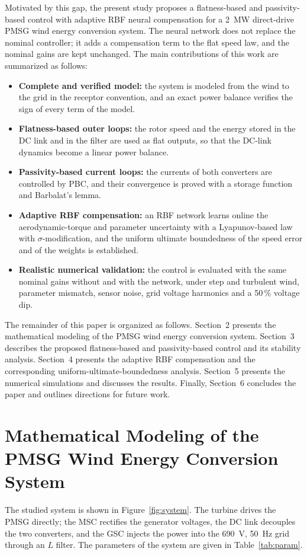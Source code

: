 \documentclass[11pt,a4paper]{article}
\begin{document}
Motivated by this gap, the present study proposes a flatness-based and passivity-based control with
adaptive RBF neural compensation for a 2~MW direct-drive PMSG wind energy conversion system. The neural
network does not replace the nominal controller; it adds a compensation term to the flat speed law, and
the nominal gains are kept unchanged. The main contributions of this work are summarized as follows:
\begin{itemize}[leftmargin=*,itemsep=2pt]
\item \textbf{Complete and verified model:} the system is modeled from the wind to the grid in the
receptor convention, and an exact power balance verifies the sign of every term of the model.
\item \textbf{Flatness-based outer loops:} the rotor speed and the energy stored in the DC link and in the
filter are used as flat outputs, so that the DC-link dynamics become a linear power balance.
\item \textbf{Passivity-based current loops:} the currents of both converters are controlled by PBC, and
their convergence is proved with a storage function and Barbalat's lemma.
\item \textbf{Adaptive RBF compensation:} an RBF network learns online the aerodynamic-torque and parameter
uncertainty with a Lyapunov-based law with $\sigma$-modification, and the uniform ultimate boundedness of
the speed error and of the weights is established.
\item \textbf{Realistic numerical validation:} the control is evaluated with the same nominal gains without
and with the network, under step and turbulent wind, parameter mismatch, sensor noise, grid voltage
harmonics and a 50\,\% voltage dip.
\end{itemize}

The remainder of this paper is organized as follows. Section~2 presents the mathematical modeling of the
PMSG wind energy conversion system. Section~3 describes the proposed flatness-based and passivity-based
control and its stability analysis. Section~4 presents the adaptive RBF compensation and the
corresponding uniform-ultimate-boundedness analysis. Section~5 presents the numerical simulations and
discusses the results. Finally, Section~6 concludes the paper and outlines directions for future work.

\section{Mathematical Modeling of the PMSG Wind Energy Conversion System}
The studied system is shown in Figure~\ref{fig:system}. The turbine drives the PMSG directly; the MSC
rectifies the generator voltages, the DC link decouples the two converters, and the GSC injects the
power into the 690~V, 50~Hz grid through an $L$ filter. The parameters of the system are given in
Table~\ref{tab:param}.
\end{document}
